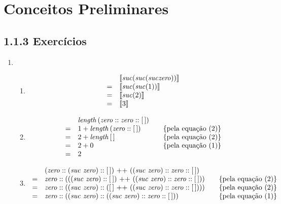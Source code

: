 \section{Conceitos Preliminares}

\subsection{1.1.3 Exerc\'icios}

	\begin{enumerate}
	  \item

	  \begin{enumerate}
	    \item
	    \[
	    \begin{array}{ll}
	    & \llbracket \textit{suc\/} (\textit{suc\/} (\textit{suc\/} \textit{zero\/})) \rrbracket\\
	    = & \llbracket \textit{suc\/} (\textit{suc\/} (1)) \rrbracket \\
	    = & \llbracket \textit{suc\/} (2) \rrbracket \\
	    = & \llbracket 3 \rrbracket \\
	    \end{array}
	    \]

	    \item
	    \[
	    \begin{array}{llcl}
	    & \length\,(\zero ::\zero :: [\,])& & \\
	    = &1 + \length \,(\zero :: [\,]) & & \{\text{pela equa\c{c}\~ao }(2)\}\\
	    = &2 + \length \,[\,] & & \{\text{pela equa\c{c}\~ao }(2)\}\\
	    = &2 + 0 & & \{\text{pela equa\c{c}\~ao }(1)\}\\
	    = &2
	    \end{array}
	    \]

	    \item
	    \[
	    \begin{array}{llcl}
	    & (\zero :: (\suc\,\,\zero) :: [\,]) \text{ ++ } ((\suc\,\,\zero) :: \zero :: [\,]) & & \\
	    = & \zero :: (((\suc\,\,\zero) :: [\,]) \text{ ++ } ((\suc\,\,\zero) :: \zero::[\,])) & & \{\text{pela equa\c{c}\~ao }(2)\}\\
	    = & \zero :: ((\suc\,\,\zero) :: ( [\,] \text{ ++ } ((\suc\,\,\zero) :: \zero::[\,]))) & & \{\text{pela equa\c{c}\~ao }(2)\}\\
	    = & \zero :: ((\suc\,\,\zero) :: ((\suc\,\,\zero) :: \zero::[\,])) & & \{\text{pela equa\c{c}\~ao }(1)\}\\
	    \end{array}
	    \]
	  \end{enumerate}


\end{enumerate}
